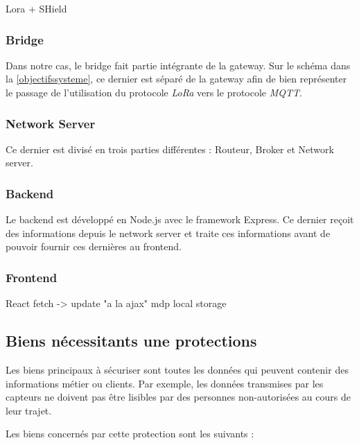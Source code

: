 \documentclass[12pt]{article}
\begin{document}
Lora + SHield

\newpage
\subsubsection{Bridge}

Dans notre cas, le bridge fait partie intégrante de la gateway. Sur le schéma dans la \autoref{objectifssysteme}, ce dernier est séparé de la gateway afin de bien représenter le passage de l'utilisation du protocole \textit{LoRa} vers le protocole \textit{MQTT}.

\subsubsection{Network Server}

Ce dernier est divisé en trois parties différentes : Routeur, Broker et Network server.

\subsubsection{Backend}

Le backend est développé en Node.js avec le framework Express. Ce dernier reçoit des informations depuis le network server et traite ces informations avant de pouvoir fournir ces dernières au frontend.

\subsubsection{Frontend}


React
fetch -> update "a la ajax"
mdp local storage

\newpage
\subsection{Biens nécessitants une protections}

Les biens principaux à sécuriser sont toutes les données qui peuvent contenir des informations métier ou clients. Par exemple, les données transmises par les capteurs ne doivent pas être lisibles par des personnes non-autorisées au cours de leur trajet.

Les biens concernés par cette protection sont les suivants :
\end{document}

